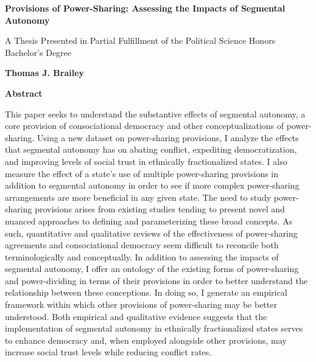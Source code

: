 \documentclass[12pt]{article}
\begin{document}
\begin{titlepage}

\begin{center}
\vspace{1cm}
\LARGE
\textbf{Provisions of Power-Sharing: Assessing the Impacts of Segmental Autonomy}

\large
\vspace{.5cm}

A Thesis Presented in Partial Fulfillment of the Political Science Honors Bachelor's Degree\\

\vspace{.5cm}

\textbf{Thomas J. Brailey}\\

\vspace{.5cm}
\Large
\vspace{.5cm}
\Large

\textbf{Abstract}
\end{center}

This paper seeks to understand the substantive effects of segmental autonomy, a core provision of consociational democracy and other conceptualizations of power-sharing. Using a new dataset on power-sharing provisions, I analyze the effects that segmental autonomy has on abating conflict, expediting democratization, and improving levels of social trust in ethnically fractionalized states. I also measure the effect of a state's use of multiple power-sharing provisions in addition to segmental autonomy in order to see if more complex power-sharing arrangements are more beneficial in any given state. The need to study power-sharing provisions arises from existing studies tending to present novel and nuanced approaches to defining and parameterizing these broad concepts. As such, quantitative and qualitative reviews of the effectiveness of power-sharing agreements and consociational democracy seem difficult to reconcile both terminologically and conceptually. In addition to assessing the impacts of segmental autonomy, I offer an ontology of the existing forms of power-sharing and power-dividing in terms of their provisions in order to better understand the relationship between these conceptions. In doing so, I generate an empirical framework within which other provisions of power-sharing may be better understood. Both empirical and qualitative evidence suggests that the implementation of segmental autonomy in ethnically fractionalized states serves to enhance democracy and, when employed alongside other provisions, may increase social trust levels while reducing conflict rates. 


\end{titlepage}
\end{document}

